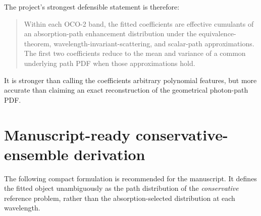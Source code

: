 \documentclass[11pt]{article}
\begin{document}
The project's strongest defensible statement is therefore:
\begin{quote}
Within each OCO-2 band, the fitted coefficients are effective cumulants of an
absorption-path enhancement distribution under the equivalence-theorem,
wavelength-invariant-scattering, and scalar-path approximations.  The first two
coefficients reduce to the mean and variance of a common underlying path PDF
when those approximations hold.
\end{quote}
It is stronger than calling the coefficients arbitrary polynomial features,
but more accurate than claiming an exact reconstruction of the geometrical
photon-path PDF.

\section{Manuscript-ready conservative-ensemble derivation}
\label{sec:manuscript_derivation}

The following compact formulation is recommended for the manuscript.  It
defines the fitted object unambiguously as the path distribution of the
\emph{conservative} reference problem, rather than the absorption-selected
distribution at each wavelength.
\end{document}
